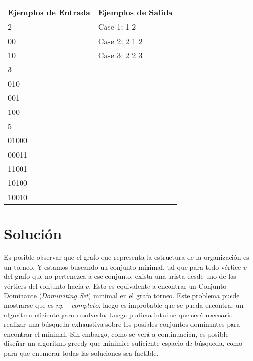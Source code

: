 \documentclass{article}
\begin{document}
\begin{statement}
	\smallskip
	\begin{center}
		\begin{tabular}{ | m{13em} | m{13em} | } 
			\hline
			Ejemplos de Entrada & Ejemplos de Salida \\
			\hline
			2                   & Case 1: 1 2        \\ 
			00                  & Case 2: 2 1 2      \\ 
			10                  & Case 3: 2 2 3      \\ 
			3                   &                    \\ 
			010                 &                    \\ 
			001                 &                    \\ 
			100                 &                    \\ 
			5                   &                    \\ 
			01000               &                    \\ 
			00011               &                    \\ 
			11001               &                    \\ 
			10100               &                    \\ 
			10010               &                    \\ 
			\hline
		\end{tabular}
	\end{center}
\end{statement}
\bigskip

\section*{Solución}

Es posible observar que el grafo que representa la estructura de la organización es 
un torneo. Y estamos buscando un conjunto minimal, tal que para todo vértice $v$ del 
grafo que no pertenezca a ese conjunto, exista una arista desde uno de los vértices 
del conjunto hacia $v$. Esto es equivalente a encontrar un Conjunto Dominante (\emph
{Dominating Set}) minimal en el grafo torneo. Este problema puede mostrarse que es 
$np-completo$, luego es improbable que se pueda encontrar un algoritmo eficiente 
para resolverlo. Luego pudiera intuirse que será necesario realizar una búsqueda 
exhaustiva sobre los posibles conjuntos dominantes para encontrar el minimal. Sin 
embargo, como se verá a continuación, es posible diseñar un algoritmo greedy que 
minimice suficiente espacio de búsqueda, como para que enumerar todas las soluciones 
sea factible.
\end{document}
